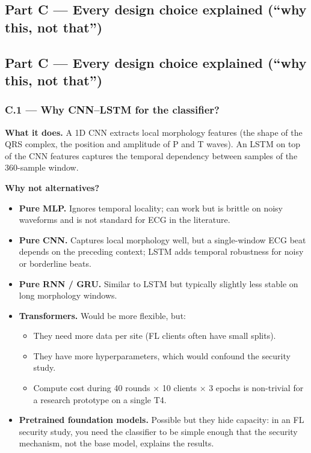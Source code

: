 \documentclass[11pt,a4paper]{article}
\begin{document}
\subsection{Part C --- Every design choice explained (``why this, not that'')}
\subsection{Part C --- Every design choice explained (``why this, not that'')}

\subsubsection{C.1 --- Why CNN--LSTM for the classifier?}

\textbf{What it does.} A 1D CNN extracts local morphology features (the
shape of the QRS complex, the position and amplitude of P and T waves).
An LSTM on top of the CNN features captures the temporal dependency
between samples of the 360-sample window.

\textbf{Why not alternatives?}
\begin{itemize}
\item \textbf{Pure MLP.} Ignores temporal locality; can work but is brittle on noisy waveforms and is not standard for ECG in the literature.
\item \textbf{Pure CNN.} Captures local morphology well, but a single-window ECG beat depends on the preceding context; LSTM adds temporal robustness for noisy or borderline beats.
\item \textbf{Pure RNN / GRU.} Similar to LSTM but typically slightly less stable on long morphology windows.
\item \textbf{Transformers.} Would be more flexible, but:
  \begin{itemize}
  \item They need more data per site (FL clients often have small splits).
  \item They have more hyperparameters, which would confound the security study.
  \item Compute cost during 40 rounds $\times$ 10 clients $\times$ 3 epochs is non-trivial for a research prototype on a single T4.
  \end{itemize}
\item \textbf{Pretrained foundation models.} Possible but they hide capacity: in an FL security study, you need the classifier to be simple enough that the security mechanism, not the base model, explains the results.
\end{itemize}
\end{document}
